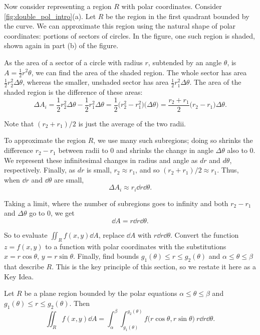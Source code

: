 Now consider representing a region $R$ with polar coordinates. Consider \autoref{fig:double_pol_intro}(a). Let $R$ be the region in the first quadrant bounded by the curve. We can approximate this region using the natural shape of polar coordinates: portions of sectors of circles. In the figure, one such region is shaded, shown again in part (b) of the figure.

As the area of a sector of a circle with radius $r$, subtended by an angle $\theta$, is $A = \frac12r^2\theta$, we can find the area of the shaded region. The whole sector has area $\frac12r_2^2\Delta \theta$, whereas the smaller, unshaded sector has area $\frac12r_1^2\Delta \theta$. The area of the shaded region is the difference of these areas:
\[\Delta A_i = \frac12r_2^2\Delta\theta-\frac12r_1^2\Delta\theta = \frac12\bigl(r_2^2-r_1^2\bigr)\bigl(\Delta\theta\bigr) = \frac{r_2+r_1}{2}\bigl(r_2-r_1\bigr)\Delta\theta.\]

Note that $(r_2+r_1)/2$ is just the average of the two radii. 

To approximate the region $R$, we use many such subregions; doing so shrinks the difference $r_2-r_1$ between radii to 0 and shrinks the change in angle $\Delta \theta$ also to 0. We represent these infinitesimal changes in radius and angle as $dr$ and $d\theta$, respectively. Finally, as $dr$ is small, $r_2\approx r_1$, and so $(r_2+r_1)/2\approx r_1$. Thus, when $\dd r$ and $\dd\theta$ are small, 
\[\Delta A_i \approx r_i\dd r\dd\theta.\]

Taking a limit, where the number of subregions goes to infinity and both $r_2-r_1$ and $\Delta\theta$ go to 0, we get \[\dd A = r\dd r\dd\theta.\]

So to evaluate $\iint_Rf(x,y)\dd A$, replace $\dd A$ with $r\dd r\dd\theta$. Convert the function $z=f(x,y)$ to a function with polar coordinates with the substitutions $x=r\cos\theta$, $y=r\sin\theta$. Finally, find bounds $g_1(\theta)\leq r\leq g_2(\theta)$ and $\alpha\leq\theta\leq\beta$ that describe $R$. This is the key principle of this section, so we restate it here as a Key Idea.

{
\begin{keyidea}\label{idea:doublepol}%
Let $R$ be a plane region bounded by the polar equations $\alpha\leq\theta\leq\beta$ and  $g_1(\theta)\leq r\leq g_2(\theta)$. Then
\[\iint_Rf(x,y)\dd A = \int_\alpha^\beta\int_{g_1(\theta)}^{g_2(\theta)} f\bigl(r\cos\theta,r\sin\theta\bigr)\ r\dd r\dd\theta.\]
\end{keyidea}}

